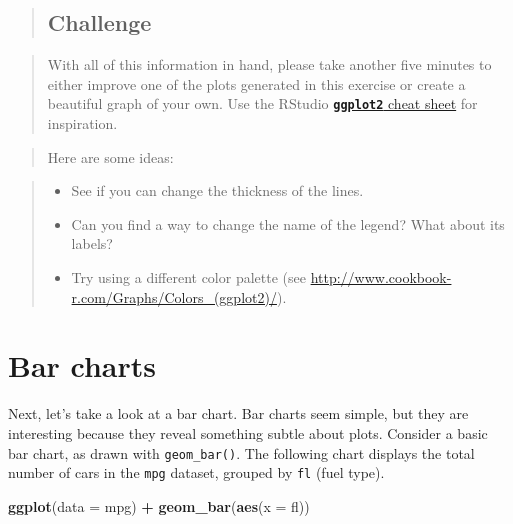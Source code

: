 \documentclass[]{book}
\newenvironment{Shaded}{\begin{snugshade}}{\end{snugshade}}
\newcommand{\KeywordTok}[1]{\textcolor[rgb]{0.13,0.29,0.53}{\textbf{#1}}}
\newcommand{\DataTypeTok}[1]{\textcolor[rgb]{0.13,0.29,0.53}{#1}}
\newcommand{\StringTok}[1]{\textcolor[rgb]{0.31,0.60,0.02}{#1}}
\newcommand{\OperatorTok}[1]{\textcolor[rgb]{0.81,0.36,0.00}{\textbf{#1}}}
\newcommand{\NormalTok}[1]{#1}
\providecommand{\tightlist}{%
  \setlength{\itemsep}{0pt}\setlength{\parskip}{0pt}}
\theoremstyle{definition}
\theoremstyle{definition}
\theoremstyle{definition}
\theoremstyle{remark}
\begin{document}
\begin{quote}
\subsection{Challenge}\label{challenge}
\end{quote}

\begin{quote}
With all of this information in hand, please take another five minutes
to either improve one of the plots generated in this exercise or create
a beautiful graph of your own. Use the RStudio
\href{https://www.rstudio.com/wp-content/uploads/2016/11/ggplot2-cheatsheet-2.1.pdf}{\textbf{\texttt{ggplot2}}
cheat sheet} for inspiration.
\end{quote}

\begin{quote}
Here are some ideas:
\end{quote}

\begin{quote}
\begin{itemize}
\tightlist
\item
  See if you can change the thickness of the lines.
\item
  Can you find a way to change the name of the legend? What about its
  labels?
\item
  Try using a different color palette (see
  \url{http://www.cookbook-r.com/Graphs/Colors_(ggplot2)/}).
\end{itemize}
\end{quote}

\section{Bar charts}\label{bar-charts}

Next, let's take a look at a bar chart. Bar charts seem simple, but they
are interesting because they reveal something subtle about plots.
Consider a basic bar chart, as drawn with \texttt{geom\_bar()}. The
following chart displays the total number of cars in the \texttt{mpg}
dataset, grouped by \texttt{fl} (fuel type).

\begin{Shaded}
\begin{Highlighting}[]
\KeywordTok{ggplot}\NormalTok{(}\DataTypeTok{data =}\NormalTok{ mpg) }\OperatorTok{+}\StringTok{ }
\StringTok{  }\KeywordTok{geom_bar}\NormalTok{(}\KeywordTok{aes}\NormalTok{(}\DataTypeTok{x =}\NormalTok{ fl))}
\end{Highlighting}
\end{Shaded}
\end{document}
